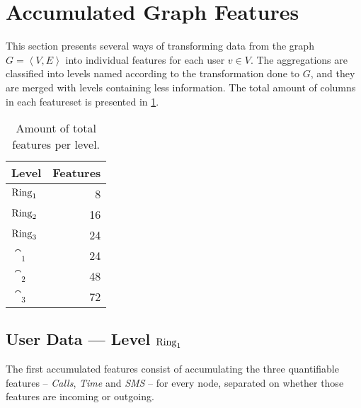\section{Accumulated Graph Features}
\label{sec:accumulatedfeatures}

This section presents several ways of transforming data from the graph $G = \left< V, E \right>$ into individual features for each user $v \in V$.
The aggregations are classified into levels named according to the transformation done to $G$, and they are merged with levels containing less information.
The total amount of columns in each featureset is presented in \cref{tab:features}.

%		

\begin{table}[t]
\centering
\begin{tabular}{>{\bfseries}l r}
\toprule
Level & Features \\
\midrule
$\operatorname{Ring}_1$ & \num{8}  \\
$\operatorname{Ring}_2$ & \num{16} \\
$\operatorname{Ring}_3$ & \num{24} \\
$\cat_1$ & \num{24} \\
$\cat_2$ & \num{48} \\
$\cat_3$ & \num{72} \\
\bottomrule
\end{tabular}
\caption{Amount of total features per level.}
\label{tab:features}
\end{table}

\subsection{User Data --- Level $\operatorname{Ring}_1$}
\label{subsec:user_data}

The first accumulated features consist of accumulating the three quantifiable features 
-- \emph{Calls}, \emph{Time} and \emph{SMS} -- for every node, separated on whether those features are incoming or outgoing.

